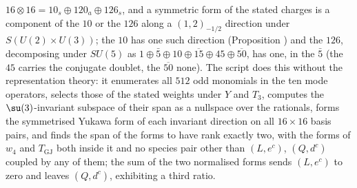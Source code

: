 $16 \otimes 16 = 10_{s} \oplus 120_{a} \oplus 126_{s}$, and a symmetric form of the stated charges is a component of the $10$ or the $126$ along a $(1, 2)_{-1/2}$ direction under $S(U(2) \times U(3))$; the $10$ has one such direction (Proposition ) and the $126$, decomposing under $SU(5)$ as $1 \oplus \bar 5 \oplus 10 \oplus \overline{15} \oplus 45 \oplus \overline{50}$, has one, in the $\bar 5$ (the $45$ carries the conjugate doublet, the $\overline{50}$ none). The script does this without the representation theory: it enumerates all $512$ odd monomials in the ten mode operators, selects those of the stated weights under $Y$ and $T_{3}$, computes the $\su(3)$-invariant subspace of their span as a nullspace over the rationals, forms the symmetrised Yukawa form of each invariant direction on all $16 \times 16$ basis pairs, and finds the span of the forms to have rank exactly two, with the forms of $w_{4}$ and $T_{\mathrm{GJ}}$ both inside it and no species pair other than $(L, e^{c})$, $(Q, d^{c})$ coupled by any of them; the sum of the two normalised forms sends $(L, e^{c})$ to zero and leaves $(Q, d^{c})$, exhibiting a third ratio.
